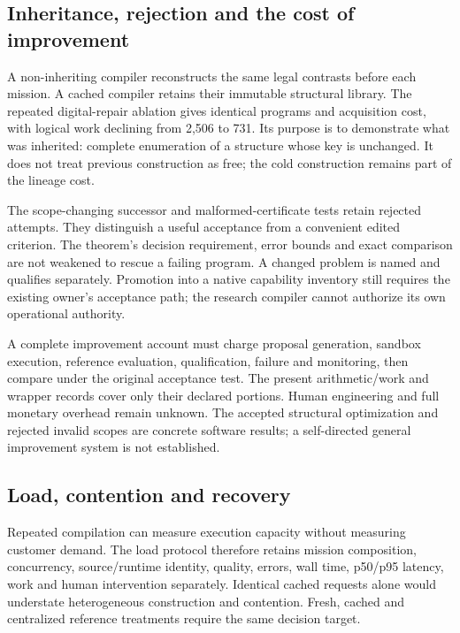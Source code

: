 \documentclass[11pt,letterpaper]{article}
\theoremstyle{definition}\newtheorem{definition}[theorem]{Definition}
\theoremstyle{remark}\newtheorem{remark}[theorem]{Remark}
\begin{document}
\subsection{Inheritance, rejection and the cost of improvement}
A non-inheriting compiler reconstructs the same legal contrasts before each mission. A cached compiler retains their immutable structural library. The repeated digital-repair ablation gives identical programs and acquisition cost, with logical work declining from 2,506 to 731. Its purpose is to demonstrate what was inherited: complete enumeration of a structure whose key is unchanged. It does not treat previous construction as free; the cold construction remains part of the lineage cost.

The scope-changing successor and malformed-certificate tests retain rejected attempts. They distinguish a useful acceptance from a convenient edited criterion. The theorem's decision requirement, error bounds and exact comparison are not weakened to rescue a failing program. A changed problem is named and qualifies separately. Promotion into a native capability inventory still requires the existing owner's acceptance path; the research compiler cannot authorize its own operational authority.

A complete improvement account must charge proposal generation, sandbox execution, reference evaluation, qualification, failure and monitoring, then compare under the original acceptance test. The present arithmetic/work and wrapper records cover only their declared portions. Human engineering and full monetary overhead remain unknown. The accepted structural optimization and rejected invalid scopes are concrete software results; a self-directed general improvement system is not established.

\subsection{Load, contention and recovery}
Repeated compilation can measure execution capacity without measuring customer demand. The load protocol therefore retains mission composition, concurrency, source/runtime identity, quality, errors, wall time, p50/p95 latency, work and human intervention separately. Identical cached requests alone would understate heterogeneous construction and contention. Fresh, cached and centralized reference treatments require the same decision target.
\end{document}
